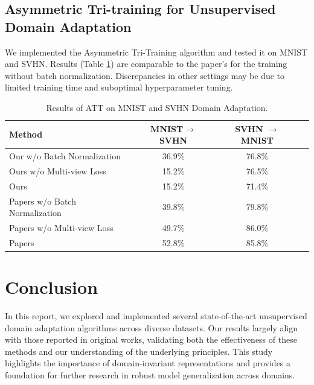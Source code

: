 \documentclass{article}
\begin{document}
\subsection{Asymmetric Tri-training for Unsupervised Domain Adaptation}
We implemented the Asymmetric Tri-Training\cite{pmlr-v70-saito17a}  algorithm and tested it on MNIST and SVHN. Results (Table \ref{tab:att_results}) are comparable to the paper's for the training without batch normalization. Discrepancies in other settings may be due to limited training time and suboptimal hyperparameter tuning.
\begin{table}
  \centering
  \caption{Results of ATT on MNIST and SVHN Domain Adaptation.}
  \label{tab:att_results}
  \begin{tabular}{lccc}
      \toprule
      \textbf{Method} & \textbf{MNIST\(\to\)SVHN} & \textbf{SVHN \(\to\) MNIST} \\
      \midrule
      Our w/o Batch Normalization & 36.9\% & 76.8\% \\
      Ours w/o Multi-view Loss & 15.2\% & 76.5\% \\
      Ours  & 15.2\% & 71.4\% \\
      \midrule
      Papers w/o Batch Normalization & 39.8\% & 79.8\% \\
      Papers w/o Multi-view Loss & 49.7\% & 86.0\% \\
      Papers  & 52.8\% & 85.8\% \\
      \bottomrule
  \end{tabular}
\end{table}








\section{Conclusion}
In this report, we explored and implemented several state-of-the-art unsupervised domain adaptation algorithms across diverse datasets. Our results largely align with those reported in original works, validating both the effectiveness of these methods and our understanding of the underlying principles. This study highlights the importance of domain-invariant representations and provides a foundation for further research in robust model generalization across domains.
\end{document}
